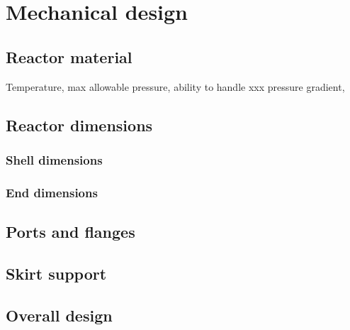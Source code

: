 \section{Mechanical design}
\subsection{Reactor material}
Temperature, max allowable pressure, ability to handle xxx pressure gradient, 
\subsection{Reactor dimensions}
\subsubsection{Shell dimensions}
\subsubsection{End dimensions}
\subsection{Ports and flanges}
\subsection{Skirt support}
\subsection{Overall design}

